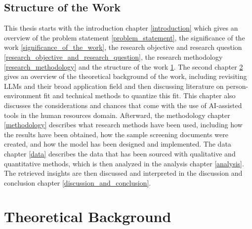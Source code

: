 \documentclass[draft,final]{thesisclass} %
\begin{document}
\section{Structure of the Work} \label{structure_of_the_work}
This thesis starts with the introduction chapter \ref{introduction} which gives an overview of the problem statement \ref{problem_statement}, the significance of the work \ref{significance_of_the_work}, the research objective and research question \ref{research_objective_and_research_question}, the research methodology \ref{research_methodology} and the structure of the work \ref{structure_of_the_work}.
The second chapter \ref{theoretical_background} gives an overview of the theoretical background of the work, including revisiting \gls{LLM}s and their broad application field and then discussing literature on person-environment fit and technical methods to quantize this fit.
This chapter also discusses the considerations and chances that come with the use of \acs{AI}-assisted tools in the human resources domain.
Afterward, the methodology chapter \ref{methodology} describes what research methods have been used, including how the results have been obtained, how the sample screening documents were created, and how the model has been designed and implemented.
The data chapter \ref{data} describes the data that has been sourced with qualitative and quantitative methods, which is then analyzed in the analysis chapter \ref{analysis}.
The retrieved insights are then discussed and interpreted in the discussion and conclusion chapter \ref{discussion_and_conclusion}.
\chapter{Theoretical Background} \label{theoretical_background}
\end{document}
